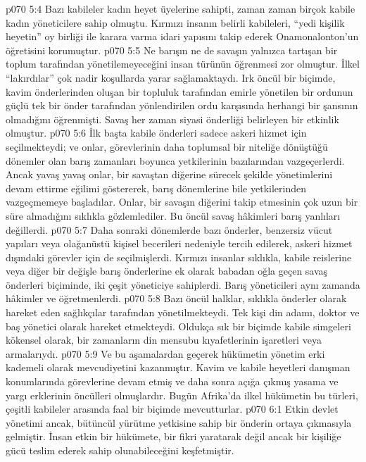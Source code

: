 \vs p070 5:4 Bazı kabileler kadın heyet üyelerine sahipti, zaman zaman birçok kabile kadın yöneticilere sahip olmuştu. Kırmızı insanın belirli kabileleri, “yedi kişilik heyetin” oy birliği ile karara varma idari yapısını takip ederek Onamonalonton’un öğretisini korumuştur.
\vs p070 5:5 Ne barışın ne de savaşın yalnızca tartışan bir toplum tarafından yönetilemeyeceğini insan türünün öğrenmesi zor olmuştur. İlkel “lakırdılar” çok nadir koşullarda yarar sağlamaktaydı. Irk öncül bir biçimde, kavim önderlerinden oluşan bir topluluk tarafından emirle yönetilen bir ordunun güçlü tek bir önder tarafından yönlendirilen ordu karşısında herhangi bir şansının olmadığını öğrenmişti. Savaş her zaman siyasi önderliği belirleyen bir etkinlik olmuştur.
\vs p070 5:6 İlk başta kabile önderleri sadece askeri hizmet için seçilmekteydi; ve onlar, görevlerinin daha toplumsal bir niteliğe dönüştüğü dönemler olan barış zamanları boyunca yetkilerinin bazılarından vazgeçerlerdi. Ancak yavaş yavaş onlar, bir savaştan diğerine sürecek şekilde yönetimlerini devam ettirme eğilimi göstererek, barış dönemlerine bile yetkilerinden vazgeçmemeye başladılar. Onlar, bir savaşın diğerini takip etmesinin çok uzun bir süre almadığını sıklıkla gözlemlediler. Bu öncül savaş hâkimleri barış yanlıları değillerdi.
\vs p070 5:7 Daha sonraki dönemlerde bazı önderler, benzersiz vücut yapıları veya olağanüstü kişisel becerileri nedeniyle tercih edilerek, askeri hizmet dışındaki görevler için de seçilmişlerdi. Kırmızı insanlar sıklıkla, kabile reislerine veya diğer bir değişle barış önderlerine ek olarak babadan oğla geçen savaş önderleri biçiminde, iki çeşit yöneticiye sahiplerdi. Barış yöneticileri aynı zamanda hâkimler ve öğretmenlerdi.
\vs p070 5:8 Bazı öncül halklar, sıklıkla önderler olarak hareket eden sağlıkçılar tarafından yönetilmekteydi. Tek kişi din adamı, doktor ve baş yönetici olarak hareket etmekteydi. Oldukça sık bir biçimde kabile simgeleri kökensel olarak, bir zamanların din mensubu kıyafetlerinin işaretleri veya armalarıydı.
\vs p070 5:9 Ve bu aşamalardan geçerek hükümetin yönetim erki kademeli olarak mevcudiyetini kazanmıştır. Kavim ve kabile heyetleri danışman konumlarında görevlerine devam etmiş ve daha sonra açığa çıkmış yasama ve yargı erklerinin öncülleri olmuşlardır. Bugün Afrika’da ilkel hükümetin bu türleri, çeşitli kabileler arasında faal bir biçimde mevcutturlar.
\vs p070 6:1 Etkin devlet yönetimi ancak, bütüncül yürütme yetkisine sahip bir önderin ortaya çıkmasıyla gelmiştir. İnsan etkin bir hükümete, bir fikri yaratarak değil ancak bir kişiliğe gücü teslim ederek sahip olunabileceğini keşfetmiştir.
